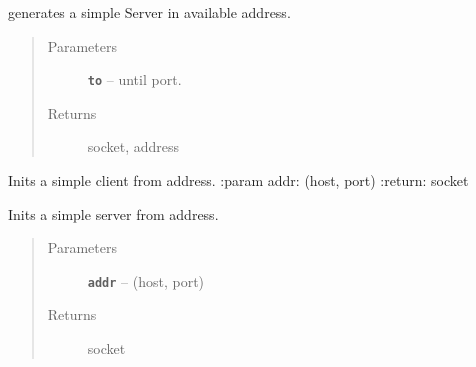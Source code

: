 \documentclass[letterpaper,10pt,english]{sphinxmanual}
\begin{document}
\begin{fulllineitems}
\label{RRtoolbox.lib:RRtoolbox.lib.serverServices.generateServer}
generates a simple Server in available address.
\begin{quote}\begin{description}
\item[{Parameters}] \leavevmode
\textbf{\texttt{to}} -- until port.

\item[{Returns}] \leavevmode
socket, address

\end{description}\end{quote}

\end{fulllineitems}


\begin{fulllineitems}
\label{RRtoolbox.lib:RRtoolbox.lib.serverServices.initClient}
Inits a simple client from address.
:param addr: (host, port)
:return: socket

\end{fulllineitems}


\begin{fulllineitems}
\label{RRtoolbox.lib:RRtoolbox.lib.serverServices.initServer}
Inits a simple server from address.
\begin{quote}\begin{description}
\item[{Parameters}] \leavevmode
\textbf{\texttt{addr}} -- (host, port)

\item[{Returns}] \leavevmode
socket

\end{description}\end{quote}

\end{fulllineitems}

\end{document}
